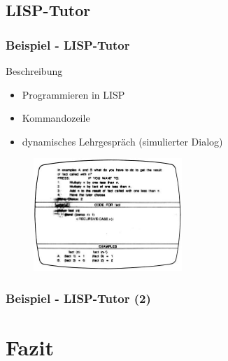 \documentclass{beamer}
\begin{document}
\subsection{LISP-Tutor}
\begin{frame}
  \frametitle{Beispiel - LISP-Tutor}
  \begin{block}{Beschreibung}
    \begin{itemize}
      \item Programmieren in LISP
      \item Kommandozeile
      \item dynamisches Lehrgespräch (simulierter Dialog)
    \end{itemize}
  \end{block}

  \begin{figure}
    \centering
    \includegraphics[width=0.5\textwidth]{../bilder/greaterp2.jpg}
  \end{figure}
\end{frame}

\begin{frame}
  \frametitle{Beispiel - LISP-Tutor (2)}

\end{frame}



\section{Fazit}
\end{document}
